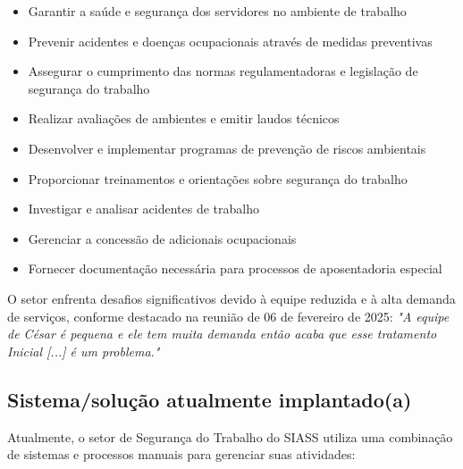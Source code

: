 \documentclass[12pt,a4paper]{article}
\begin{document}
\begin{itemize}
    \item Garantir a saúde e segurança dos servidores no ambiente de trabalho
    \item Prevenir acidentes e doenças ocupacionais através de medidas preventivas
    \item Assegurar o cumprimento das normas regulamentadoras e legislação de segurança do trabalho
    \item Realizar avaliações de ambientes e emitir laudos técnicos
    \item Desenvolver e implementar programas de prevenção de riscos ambientais
    \item Proporcionar treinamentos e orientações sobre segurança do trabalho
    \item Investigar e analisar acidentes de trabalho
    \item Gerenciar a concessão de adicionais ocupacionais
    \item Fornecer documentação necessária para processos de aposentadoria especial
\end{itemize}

O setor enfrenta desafios significativos devido à equipe reduzida e à alta demanda de serviços, conforme destacado na reunião de 06 de fevereiro de 2025: \textit{"A equipe de César é pequena e ele tem muita demanda então acaba que esse tratamento Inicial [...] é um problema."}

\subsection{Sistema/solução atualmente implantado(a)}
Atualmente, o setor de Segurança do Trabalho do SIASS utiliza uma combinação de sistemas e processos manuais para gerenciar suas atividades:
\end{document}
